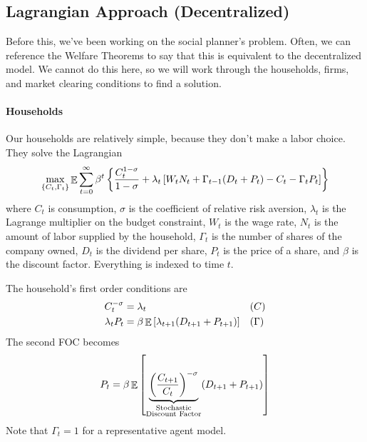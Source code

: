 \documentclass[10pt]{article}
\begin{document}
\subsection{Lagrangian Approach (Decentralized)}

\begin{model}
	 Before this, we've been working on the social planner's problem. Often, we can reference the Welfare Theorems to say that this is equivalent to the decentralized model. We cannot do this here, so we will work through the households, firms, and market clearing conditions to find a solution.
	
	\paragraph{Households} Our households are relatively simple, because they don't make a labor choice. They solve the Lagrangian
	\[
	\max_{\{C_t,\Gamma_t\}} \mathop{\mathbb{E}} \sum_{t=0}^\infty  \beta^t \left\{ \frac{C_t^{1-\sigma}}{1-\sigma} + \lambda_t \left[ W_tN_t + \Gamma_{t-1} (D_t + P_t) - C_t - \Gamma_t P_t\right] \right\}
	\]
	where $C_t$ is consumption, $\sigma$ is the coefficient of relative risk aversion, $\lambda_t$ is the Lagrange multiplier on the budget constraint, $W_t$ is the wage rate, $N_t$ is the amount of labor supplied by the household, $\Gamma_t$ is the number of shares of the company owned, $D_t$ is the dividend per share, $P_t$ is the price of a share, and $\beta$ is the discount factor. Everything is indexed to time $t$.
	
	The household's first order conditions are
	\begin{align*}
		C_t^{-\sigma} &= \lambda_t &&(C) \\
		\lambda_t P_t &= \beta \mathop{\mathbb{E}} \left[ \lambda_{t+1} (D_{t+1} + P_{t+1})\right] &&(\Gamma)
	\end{align*}
	The second FOC becomes
	\[
	P_t = \beta \mathop{\mathbb{E}} \left[ \underbrace{\left( \frac{C_{t+1}}{C_t}\right)^{-\sigma}}_{\substack{ \text{Stochastic} \\ \text{Discount Factor}}}(D_{t+1} + P_{t+1})\right]
	\]
	Note that $\Gamma_t = 1$ for a representative agent model.
	

\end{model}
\end{document}
